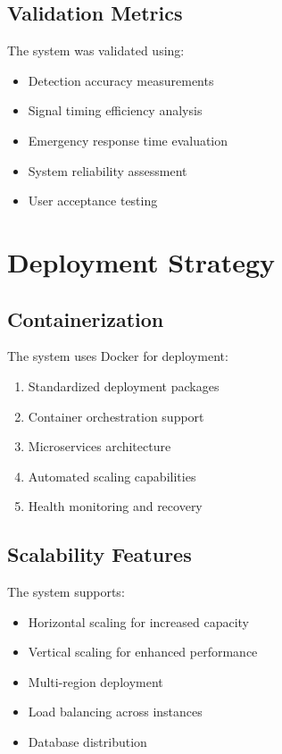 \subsection{Validation Metrics}

The system was validated using:

\begin{itemize}
    \item Detection accuracy measurements
    \item Signal timing efficiency analysis
    \item Emergency response time evaluation
    \item System reliability assessment
    \item User acceptance testing
\end{itemize}

\section{Deployment Strategy}

\subsection{Containerization}

The system uses Docker for deployment:

\begin{enumerate}
    \item Standardized deployment packages
    \item Container orchestration support
    \item Microservices architecture
    \item Automated scaling capabilities
    \item Health monitoring and recovery
\end{enumerate}

\subsection{Scalability Features}

The system supports:

\begin{itemize}
    \item Horizontal scaling for increased capacity
    \item Vertical scaling for enhanced performance
    \item Multi-region deployment
    \item Load balancing across instances
    \item Database distribution
\end{itemize}


